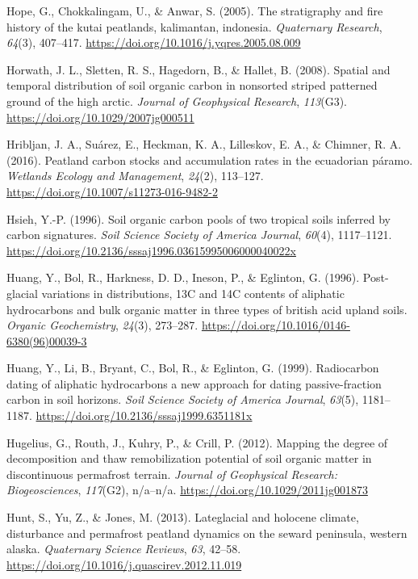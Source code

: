 \documentclass[]{article}
\begin{document}
\leavevmode\hypertarget{ref-Hope_2005}{}%
Hope, G., Chokkalingam, U., \& Anwar, S. (2005). The stratigraphy and
fire history of the kutai peatlands, kalimantan, indonesia.
\emph{Quaternary Research}, \emph{64}(3), 407--417.
\url{https://doi.org/10.1016/j.yqres.2005.08.009}

\leavevmode\hypertarget{ref-Horwath_2008}{}%
Horwath, J. L., Sletten, R. S., Hagedorn, B., \& Hallet, B. (2008).
Spatial and temporal distribution of soil organic carbon in nonsorted
striped patterned ground of the high arctic. \emph{Journal of
Geophysical Research}, \emph{113}(G3).
\url{https://doi.org/10.1029/2007jg000511}

\leavevmode\hypertarget{ref-Hribljan_2016}{}%
Hribljan, J. A., Suárez, E., Heckman, K. A., Lilleskov, E. A., \&
Chimner, R. A. (2016). Peatland carbon stocks and accumulation rates in
the ecuadorian páramo. \emph{Wetlands Ecology and Management},
\emph{24}(2), 113--127. \url{https://doi.org/10.1007/s11273-016-9482-2}

\leavevmode\hypertarget{ref-Hsieh_1996}{}%
Hsieh, Y.-P. (1996). Soil organic carbon pools of two tropical soils
inferred by carbon signatures. \emph{Soil Science Society of America
Journal}, \emph{60}(4), 1117--1121.
\url{https://doi.org/10.2136/sssaj1996.03615995006000040022x}

\leavevmode\hypertarget{ref-Huang_1996}{}%
Huang, Y., Bol, R., Harkness, D. D., Ineson, P., \& Eglinton, G. (1996).
Post-glacial variations in distributions, 13C and 14C contents of
aliphatic hydrocarbons and bulk organic matter in three types of british
acid upland soils. \emph{Organic Geochemistry}, \emph{24}(3), 273--287.
\url{https://doi.org/10.1016/0146-6380(96)00039-3}

\leavevmode\hypertarget{ref-Huang_1999}{}%
Huang, Y., Li, B., Bryant, C., Bol, R., \& Eglinton, G. (1999).
Radiocarbon dating of aliphatic hydrocarbons a new approach for dating
passive-fraction carbon in soil horizons. \emph{Soil Science Society of
America Journal}, \emph{63}(5), 1181--1187.
\url{https://doi.org/10.2136/sssaj1999.6351181x}

\leavevmode\hypertarget{ref-Hugelius_2012}{}%
Hugelius, G., Routh, J., Kuhry, P., \& Crill, P. (2012). Mapping the
degree of decomposition and thaw remobilization potential of soil
organic matter in discontinuous permafrost terrain. \emph{Journal of
Geophysical Research: Biogeosciences}, \emph{117}(G2), n/a--n/a.
\url{https://doi.org/10.1029/2011jg001873}

\leavevmode\hypertarget{ref-Hunt_2013}{}%
Hunt, S., Yu, Z., \& Jones, M. (2013). Lateglacial and holocene climate,
disturbance and permafrost peatland dynamics on the seward peninsula,
western alaska. \emph{Quaternary Science Reviews}, \emph{63}, 42--58.
\url{https://doi.org/10.1016/j.quascirev.2012.11.019}
\end{document}
